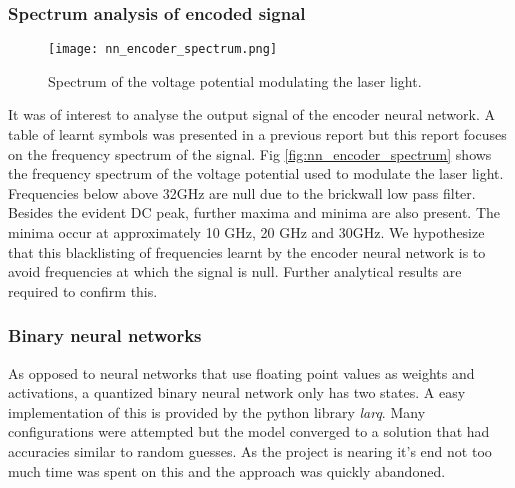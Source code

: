 \subsubsection{Spectrum analysis of encoded signal}
    
    \begin{figure}[H]
        \centering
        \texttt{[image: nn\_encoder\_spectrum.png]}
        \caption{Spectrum of the voltage potential modulating the laser light.}
        \label{fig:nn_encoder_spectrum}
    \end{figure}
    
    It was of interest to analyse the output signal of the encoder neural network. A table of learnt symbols was presented in a previous report but this report focuses on the frequency spectrum of the signal. Fig \autoref{fig:nn_encoder_spectrum} shows the frequency spectrum of the voltage potential used to modulate the laser light. Frequencies below above 32GHz are null due to the brickwall low pass filter. Besides the evident DC peak, further maxima and minima are also present. The minima occur at approximately 10 GHz, 20 GHz and 30GHz. We hypothesize that this blacklisting of frequencies learnt by the encoder neural network is to avoid frequencies at which the signal is null. Further analytical results are required to confirm this.
    
\subsubsection{Binary neural networks}
    
    As opposed to neural networks that use floating point values as weights and activations, a quantized binary neural network only has two states. A easy implementation of this is provided by the python library \textit{larq}. Many configurations were attempted but the model converged to a solution that had accuracies similar to random guesses. As the project is nearing it's end not too much time was spent on this and the approach was quickly abandoned. 